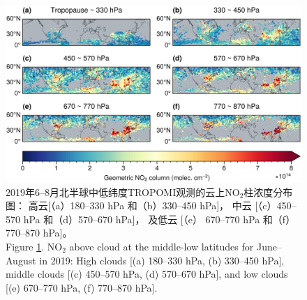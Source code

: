 \begin{figure}[!htbp]
    \centering
    \includegraphics[width=15cm]{./figures/no2geo_tropomi.png}
    \caption{
    2019年6--8月北半球中低纬度TROPOMI观测的云上NO$_2$柱浓度分布图：
    高云[（a）180--330 hPa 和（b）330--450 hPa]，
    中云 [（c）450--570 hPa 和（d）570--670 hPa]，
    及低云 [（e） 670--770 hPa 和（f）770--870 hPa]。 \\
    Figure \ref{fig:no2geo_tropomi}. NO$_2$ above cloud at the middle-low latitudes for June--August in 2019:
    High clouds [(a) 180--330 hPa, (b) 330--450 hPa],
    middle clouds [(c) 450--570 hPa, (d) 570--670 hPa],
    and low clouds [(e) 670--770 hPa, (f) 770--870 hPa].
    }
    \label{fig:no2geo_tropomi}
\end{figure}



